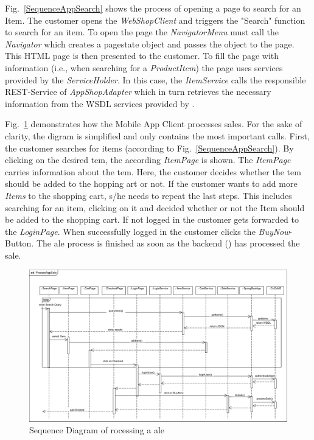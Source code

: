 Fig.~\ref{SequenceAppSearch} shows the process of opening a page to search for an Item. 
The customer opens the \textit{WebShopClient} and triggers the "Search" function to search for an item. 
To open the page the \textit{NavigatorMenu} must call the \textit{Navigator} which creates a pagestate object and passes the object to the page. 
This HTML page is then presented to the customer. 
To fill the page with information (i.e., when searching for a \textit{ProductItem}) the page uses services provided by the \textit{ServiceHolder}. 
In this case, the \textit{ItemService} calls the responsible REST-Service of \textit{AppShopAdapter} which in turn retrieves the necessary information from the WSDL services provided by \CoCoME.

Fig.~\ref{SequenceAppSale} demonstrates how the Mobile App Client processes sales. 
For the sake of clarity, the digram is simplified and only contains the most important calls. 
First, the customer searches for items (according to Fig.~\ref{SequenceAppSearch}). 
By clicking on the desired tem, the according \textit{ItemPage} is shown. 
The \textit{ItemPage} carries information about the tem. 
Here, the customer decides whether the tem should be added to the hopping art or not. 
If the customer wants to add more \textit{Items} to the shopping cart, s/he needs to repeat the last steps. This includes searching for an item, clicking on it and decided whether or not the Item should be added to the shopping cart.
If not logged in the customer gets forwarded to the \textit{LoginPage}. 
When successfully logged in the customer clicks the \textit{BuyNow}-Button. 
The ale process is finished as soon as the backend (\CoCoME) has processed the sale.


\begin{figure}[!h]
	\includegraphics[width=\textwidth]{img/appProcessSale.png}
	\caption{Sequence Diagram of rocessing a ale}
	\label{SequenceAppSale}
\end{figure}

